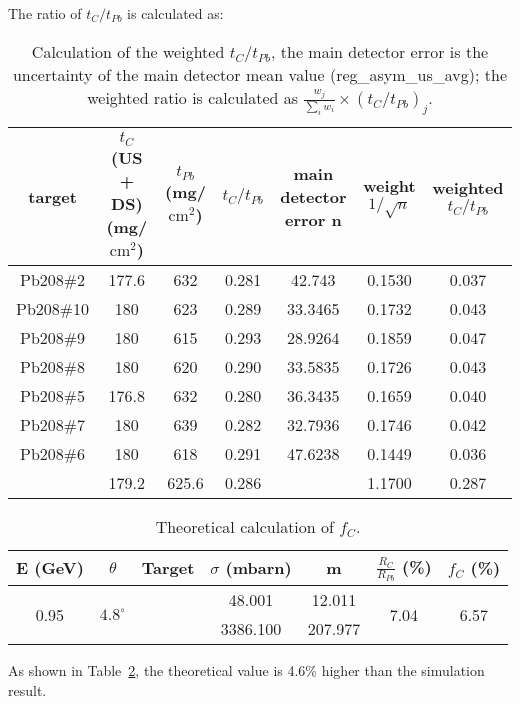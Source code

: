 The ratio of $t_C/t_{Pb}$ is calculated as:
\begin{table}[!h]
    \centering
    \begin{tabular}{c | c c c | c c c}
	\hline
	target	& \makecell{$t_C$ (US + DS) \\ (mg/$\mathrm{cm}^2$)} & \makecell{$t_{Pb}$ \\ (mg/$\mathrm{cm}^2$)}	
	& $t_C/t_{Pb}$  & \makecell{main detector \\ error n} & \makecell{weight \\ $1/\sqrt{n}$}    & \makecell{weighted \\ $t_C/t_{Pb}$} \\
	\hline
	Pb208\#2    & 177.6	& 632	& 0.281	& 42.743    & 0.1530	& 0.037 \\
	Pb208\#10   & 180	& 623	& 0.289	& 33.3465   & 0.1732	& 0.043	\\
	Pb208\#9    & 180	& 615   & 0.293 & 28.9264   & 0.1859   	& 0.047	\\
	Pb208\#8    & 180	& 620   & 0.290 & 33.5835   & 0.1726   	& 0.043	\\
	Pb208\#5    & 176.8	& 632   & 0.280 & 36.3435   & 0.1659   	& 0.040	\\
	Pb208\#7    & 180	& 639   & 0.282 & 32.7936   & 0.1746   	& 0.042	\\
	Pb208\#6    & 180	& 618   & 0.291 & 47.6238   & 0.1449   	& 0.036	\\
	\hline
		    & 179.2	& 625.6	& 0.286	&	    & 1.1700	& \color{red} 0.287 \\
	\hline                                                
    \end{tabular}
    \caption[carbon rate fraction]
    {Calculation of the weighted $t_C/t_{Pb}$, the main detector error is
    the uncertainty of the main detector mean value (reg\_asym\_us\_avg); the 
    weighted ratio is calculated as $\frac{w_j}{\sum_i w_i} \times \left( t_C/t_{Pb} \right)_j$.}
    \label{tab:ratio_of_area_density}
\end{table}

\begin{table}[!h]
    \centering
    \begin{tabular}{c c | c c c | c c}
	\hline
	E (GeV)   & $\theta$  & Target    & $\sigma$ (mbarn)    & m & $\frac{R_C}{R_{Pb}}$ (\%) & $f_C$ (\%)    \\
	\hline
	\multirow{2}{*}{0.95}	& \multirow{2}{*}{$4.8^\circ$}	& 
	      \Carbon    & 48.001	& 12.011    & \multirow{2}{*}{7.04} & \multirow{2}{*}{6.57} \\
	\cline{3-5}
	&   & \Pb   & 3386.100	& 207.977   &	& \\
	\hline
    \end{tabular}
    \caption{Theoretical calculation of $f_C$. 
    }
    \label{tab:theoretical_value}
\end{table}
As shown in Table~\ref{tab:theoretical_value}, the theoretical value is 4.6\% higher than the simulation result.

